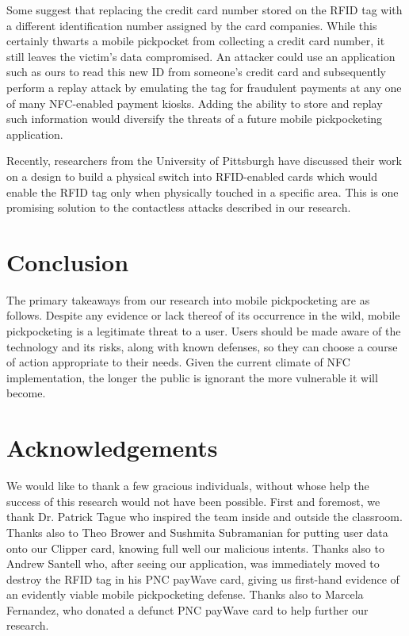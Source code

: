 \documentclass{IEEEtran}
\begin{document}
Some suggest that replacing the credit card number stored on the RFID tag with a different identification number assigned by the card companies. While this certainly thwarts a mobile pickpocket from collecting a credit card number, it still leaves the victim's data compromised. An attacker could use an application such as ours to read this new ID from someone's credit card and subsequently perform a replay attack by emulating the tag for fraudulent payments at any one of many NFC-enabled payment kiosks.  Adding the ability to store and replay such information would diversify the threats of a future mobile pickpocketing application.  

Recently, researchers from the University of Pittsburgh have discussed their work on a design to build a physical switch into RFID-enabled cards which would enable the RFID tag only when physically touched in a specific area. This is one promising solution to the contactless attacks described in our research. \cite{upitt-rfid-switch}

\section{Conclusion}
The primary takeaways from our research into mobile pickpocketing are as follows.  Despite any evidence or lack thereof of its occurrence in the wild, mobile pickpocketing is a legitimate threat to a user.  Users should be made aware of the technology and its risks, along with known defenses, so they can choose a course of action appropriate to their needs.  Given the current climate of NFC implementation, the longer the public is ignorant the more vulnerable it will become.

\section*{Acknowledgements}
We would like to thank a few gracious individuals, without whose help the success of this research would not have been possible.  First and foremost, we thank Dr. Patrick Tague who inspired the team inside and outside the classroom.  Thanks also to Theo Brower and Sushmita Subramanian for putting user data onto our Clipper card, knowing full well our malicious intents.  Thanks also to Andrew Santell who, after seeing our application, was immediately moved to destroy the RFID tag in his PNC payWave card, giving us first-hand evidence of an evidently viable mobile pickpocketing defense.  Thanks also to Marcela Fernandez, who donated a defunct PNC payWave card to help further our research.

%
%



\nocite{*}
\end{document}
